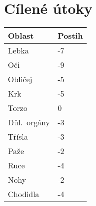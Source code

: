 \documentclass[11pt]{article}
\begin{document}
\hspace{1mm}
\begin{minipage}[t]{0.24\textwidth}

  \section*{Cílené útoky}\vspace{-0.5\baselineskip}
  \begin{tabu} to \linewidth {|X[1lm]|X[1,c,m]|} \firsthline
    \rowfont{\sc\color{white}} 
      Oblast & Postih \\ \hline

    Lebka & -7 \\ \hline
    Oči & -9 \\ \hline
    Obličej & -5 \\ \hline
    Krk & -5 \\ \hline
    Torzo & 0 \\ \hline
    Důl.~orgány\footnotemark[1] & -3 \\ \hline
    Třísla & -3 \\ \hline
    Paže & -2 \\ \hline
    Ruce & -4 \\ \hline
    Nohy & -2 \\ \hline
    Chodidla & -4 \\ \hline
  \end{tabu}

\end{minipage}
\hspace{1mm}
\end{document}
